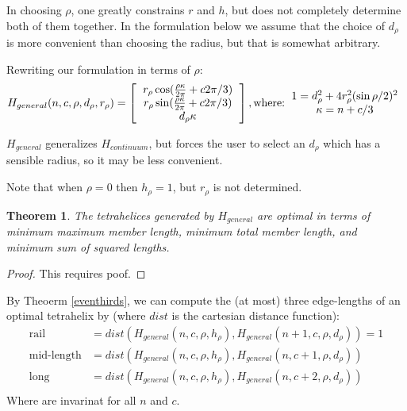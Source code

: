 \documentclass[11pt]{article}
\newtheorem{theorem}{Theorem}
\begin{document}
In choosing $\rho$, one greatly constrains $r$ and $h$, but does not completely
determine both of them together. In the formulation below we assume that
the choice of $d_{\rho}$ is more convenient than choosing the radius,
but that is somewhat arbitrary.


Rewriting our formulation in terms of $\rho$:
\[
H_{general}(n,c,\rho,d_{\rho},r_{\rho}) =
\left [
  \begin{tabular}{c}
   $ r_{\rho} \cos(\frac{\rho \kappa}{2\pi} + c 2 \pi /3) $\\
   $ r_{\rho}  \sin(\frac{\rho \kappa}{2\pi} + c 2 \pi /3) $\\
   $ d_{\rho} \kappa $
  \end{tabular}
  \right ],
\text{where:}
\begin{tabular}{c}
  $   1 = d_{\rho}^2 + 4 r_{\rho}^2 (\sin{ \rho / 2})^2 $ \\
    $\kappa = n + c/3$ \\
  \end{tabular}      
\]

$H_{general}$ generalizes $H_{continuum}$, but forces the user to select an $d_{\rho}$
which has a sensible radius, so it may be less convenient.

Note that when $\rho = 0$ then $h_{\rho} = 1$, but $r_{\rho}$ is not determined.

\begin{theorem}
  \label{generalformulaoptimal}
  The tetrahelices generated by $H_{general}$ are optimal in terms of minimum maximum member length, minimum total member length, and minimum
  sum of squared lengths.
\end{theorem}


\begin{proof}
  This requires poof.
\end{proof}

By Theoerm \ref{eventhirds}, we can compute the (at most) three edge-lengths of an optimal
tetrahelix by (where $dist$ is the cartesian distance function):
\begin{align*}
  \text{rail} &= dist(H_{general}(n,c,\rho,h_{\rho}),H_{general}(n+1,c,\rho,d_{\rho})) = 1 \\
  \text{mid-length} &= dist(H_{general}(n,c,\rho,h_{\rho}),H_{general}(n,c+1,\rho,d_{\rho}))  \\
  \text{long} &= dist(H_{general}(n,c,\rho,h_{\rho}),H_{general}(n,c+2,\rho,d_{\rho}))  \\  
\end{align*}
Where are invarinat for all $n$ and $c$.
\end{document}
